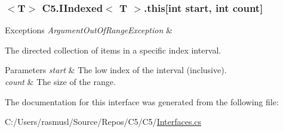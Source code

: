 \subsubsection[{this[int start, int count]}]{$<$T$>$ {\bf C5.\+I\+Indexed}$<$ T $>$.this\mbox{[}int start, int count\mbox{]}\hspace{0.3cm}{\ttfamily [get]}}\label{interface_c5_1_1_i_indexed_a7d2ebaba4aefbc5240fb95893596337a}





\begin{DoxyExceptions}{Exceptions}
{\em Argument\+Out\+Of\+Range\+Exception} & \\
\hline
\end{DoxyExceptions}


The directed collection of items in a specific index interval.


\begin{DoxyParams}{Parameters}
{\em start} & The low index of the interval (inclusive).\\
\hline
{\em count} & The size of the range.\\
\hline
\end{DoxyParams}


The documentation for this interface was generated from the following file\+:\begin{DoxyCompactItemize}
\item 
C\+:/\+Users/rasmusl/\+Source/\+Repos/\+C5/\+C5/\hyperlink{_interfaces_8cs}{Interfaces.\+cs}\end{DoxyCompactItemize}
